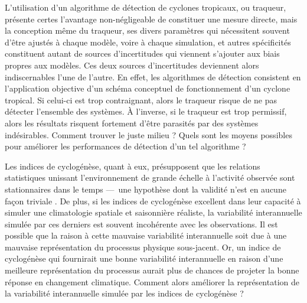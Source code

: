 \documentclass[../main.tex]{subfiles}
\begin{document}
L'utilisation d'un algorithme de détection de cyclones tropicaux, ou traqueur, présente certes l'avantage non-négligeable de constituer une mesure directe, mais
la conception même du traqueur, ses divers paramètres qui nécessitent souvent d'être ajustés à chaque modèle, voire à chaque simulation, et autres spécificités
constituent autant de sources d'incertitudes qui viennent s'ajouter aux biais propres aux modèles. Ces deux sources d'incertitudes deviennent alors
indiscernables l'une de l'autre. En effet, les algorithmes de détection consistent en l'application objective d'un schéma conceptuel de fonctionnement d'un
cyclone tropical. Si celui-ci est trop contraignant, alors le traqueur risque de ne pas détecter l'ensemble des systèmes. À l'inverse, si le traqueur est trop
permissif, alors les résultats risquent fortement d'être parasités par des systèmes indésirables. Comment trouver le juste milieu ? Quels sont les moyens
possibles pour améliorer les performances de détection d'un tel algorithme ? 


Les indices de cyclogénèse, quant à eux, présupposent que les relations statistiques unissant l'environnement de grande échelle à l'activité observée sont
stationnaires dans le temps ---~une hypothèse dont la validité n'est en aucune façon triviale \parencite{nolan_increased_2008,murakami_changes_2013}. De plus,
si les indices de cyclogénèse excellent dans leur capacité à simuler une climatologie spatiale et saisonnière réaliste, la variabilité interannuelle simulée par
ces derniers est souvent incohérente avec les observations. Il est possible que la raison à cette mauvaise variabilité interannuelle soit due à une mauvaise
représentation du processus physique sous-jacent. Or, un indice de cyclogénèse qui fournirait une bonne variabilité interannuelle en raison d'une meilleure
représentation du processus aurait plus de chances de projeter la bonne réponse en changement climatique. Comment alors améliorer la représentation de la
variabilité interannuelle simulée par les indices de cyclogénèse ?
\end{document}
